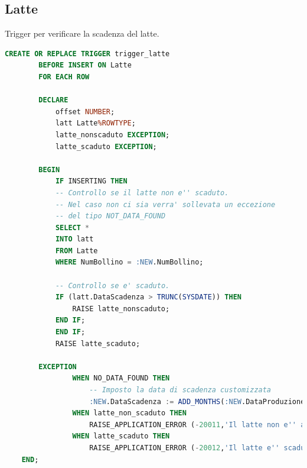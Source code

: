 \documentclass[12pt]{report}
\begin{document}
\subsection*{Latte}
Trigger per verificare la scadenza del latte.
\begin{lstlisting}[language=SQL,caption={TR\_Latte}]
	CREATE OR REPLACE TRIGGER trigger_latte
		BEFORE INSERT ON Latte
		FOR EACH ROW

		DECLARE
			offset NUMBER;
			latt Latte%ROWTYPE;
			latte_nonscaduto EXCEPTION;
			latte_scaduto EXCEPTION;

		BEGIN
			IF INSERTING THEN
			-- Controllo se il latte non e'' scaduto. 
			-- Nel caso non ci sia verra' sollevata un eccezione
			-- del tipo NOT_DATA_FOUND
			SELECT * 
			INTO latt
			FROM Latte
			WHERE NumBollino = :NEW.NumBollino;

			-- Controllo se e' scaduto. 
			IF (latt.DataScadenza > TRUNC(SYSDATE)) THEN
				RAISE latte_nonscaduto;
			END IF;
			END IF;
			RAISE latte_scaduto;
		
		EXCEPTION
                WHEN NO_DATA_FOUND THEN
                    -- Imposto la data di scadenza customizzata
                    :NEW.DataScadenza := ADD_MONTHS(:NEW.DataProduzione,12*offset);
                WHEN latte_non_scaduto THEN
                    RAISE_APPLICATION_ERROR (-20011,'Il latte non e'' ancora scaduto.');
                WHEN latte_scaduto THEN 
                    RAISE_APPLICATION_ERROR (-20012,'Il latte e'' scaduto.');
	END;
\end{lstlisting}
\end{document}
